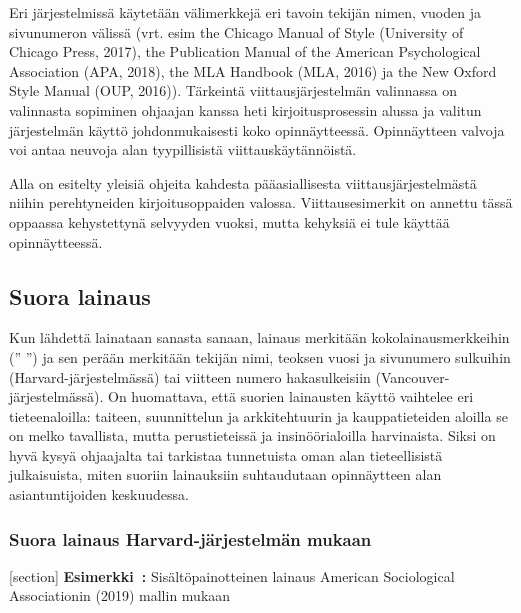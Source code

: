 \documentclass[finnish, 12pt, a4paper, arts, utf8, a-2b, online]{aaltothesis}
\begin{document}
Eri järjestelmissä käytetään välimerkkejä eri tavoin tekijän nimen, vuoden ja 
sivunumeron välissä (vrt. esim the Chicago Manual of Style (University of 
Chicago Press, 2017), the Publication Manual of the American Psychological 
Association (APA, 2018), the MLA Handbook (MLA, 2016) ja the New Oxford Style 
Manual (OUP, 2016)). Tärkeintä viittausjärjestelmän valinnassa on valinnasta 
sopiminen ohjaajan kanssa heti kirjoitusprosessin alussa ja valitun järjestelmän
käyttö johdonmukaisesti koko opinnäytteessä. Opinnäytteen valvoja voi antaa 
neuvoja alan tyypillisistä viittauskäytännöistä.

Alla on esitelty yleisiä ohjeita kahdesta pääasiallisesta viittausjärjestelmästä
niihin perehtyneiden kirjoitusoppaiden valossa. Viittausesimerkit on annettu 
tässä oppaassa kehystettynä selvyyden vuoksi, mutta kehyksiä ei tule käyttää 
opinnäytteessä.


\subsection*{Suora lainaus}

Kun lähdettä lainataan sanasta sanaan, lainaus merkitään kokolainausmerkkeihin 
(” ”) ja sen perään merkitään tekijän nimi, teoksen vuosi ja sivunumero 
sulkuihin (Harvard-järjestelmässä) tai viitteen numero hakasulkeisiin 
(Vancouver-järjestelmässä). On huomattava, että suorien lainausten käyttö 
vaihtelee eri tieteenaloilla: taiteen, suunnittelun ja arkkitehtuurin ja 
kauppatieteiden aloilla se on melko tavallista, mutta perustieteissä ja 
insinöörialoilla harvinaista. Siksi on hyvä kysyä ohjaajalta tai tarkistaa 
tunnetuista oman alan tieteellisistä julkaisuista, miten suoriin lainauksiin 
suhtaudutaan opinnäytteen alan asiantuntijoiden keskuudessa.


\subsubsection*{Suora lainaus Harvard-järjestelmän mukaan}

[section]
\textsf{\textbf{Esimerkki~\theexample:}} Sisältöpainotteinen lainaus American Sociological Associationin (2019) mallin mukaan

\vspace{1ex}
\noindent
{}
\end{document}
